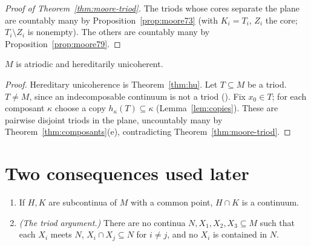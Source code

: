 
\begin{proof}[Proof of Theorem~\ref{thm:moore-triod}]
The triods whose cores separate the plane are countably many by Proposition~\ref{prop:moore73} (with
$K_i=T_i$, $Z_i$ the core; $T_i\setminus Z_i$ is nonempty). The others are countably many by
Proposition~\ref{prop:moore79}.
\end{proof}


\begin{theorem}\label{thm:hagopian-lemma1}
$M$ is atriodic and hereditarily unicoherent.
\end{theorem}

\begin{proof}
Hereditary unicoherence is Theorem~\ref{thm:hu}. Let $T\subseteq M$ be a triod. $T\neq M$, since an
indecomposable continuum is not a triod (). Fix $x_0\in T$; for each composant
$\kappa$ choose a copy $h_\kappa(T)\subseteq\kappa$ (Lemma~\ref{lem:copies}). These are pairwise disjoint triods in the
plane, uncountably many by Theorem~\ref{thm:composants}(e), contradicting Theorem~\ref{thm:moore-triod}.
\end{proof}


\section{Two consequences used later}

\begin{corollary}\label{cor:nested-or-arc}
\leavevmode
\begin{enumerate}[label=(\alph*)]
\item If $H,K$ are subcontinua of $M$ with a common point, $H\cap K$ is a continuum.
\item \emph{(The triod argument.)} There are no continua $N,X_1,X_2,X_3\subseteq M$ such that each $X_i$ meets
$N$, $X_i\cap X_j\subseteq N$ for $i\neq j$, and no $X_i$ is contained in $N$.
\end{enumerate}
\end{corollary}


